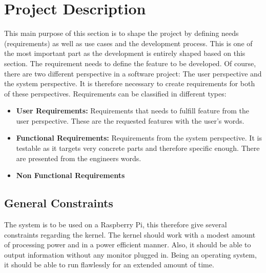 \chapter{Project Description}

This main purpose of this section is to shape the project by defining needs (requirements) as well as use cases and the development process. This is one of the most important part as the development is entirely shaped based on this section.
The requirement needs to define the feature to be developed. Of course, there are two different perspective in a software project: The user perspective and the system perspective. It is therefore necessary to create requirements for both of these perspectives. Requirements can be classified in different types:
\begin{itemize}
\item\textbf{User Requirements:} Requirements that needs to fulfill feature from the user perspective. These are the requested features with the user's words.
\item\textbf{Functional Requirements:} Requirements from the system perspective. It is testable as it targets very concrete parts and therefore specific enough. There are presented from the engineers words.
\item\textbf{Non Functional Requirements}
\end{itemize}


\section{General Constraints}

The system is to be used on a Raspberry Pi, this therefore give several constraints regarding the kernel. The kernel should work with a modest amount of processing power and in a power efficient manner. Also, it should be able to output information without any monitor plugged in.
Being an operating system, it should be able to run flawlessly for an extended amount of time.


